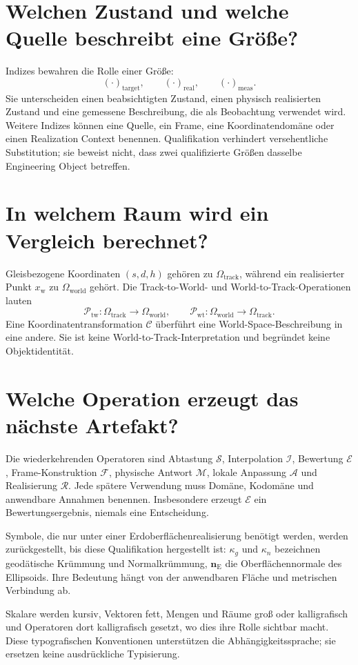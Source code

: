 \section{Welchen Zustand und welche Quelle beschreibt eine Größe?}

Indizes bewahren die Rolle einer Größe:
\[
(\cdot)_{\mathrm{target}},\qquad
(\cdot)_{\mathrm{real}},\qquad
(\cdot)_{\mathrm{meas}}.
\]
Sie unterscheiden einen beabsichtigten Zustand, einen physisch realisierten
Zustand und eine gemessene Beschreibung, die als Beobachtung verwendet wird.
Weitere Indizes können eine Quelle, ein Frame, eine Koordinatendomäne oder
einen Realization Context benennen. Qualifikation verhindert versehentliche
Substitution; sie beweist nicht, dass zwei qualifizierte Größen dasselbe
Engineering Object betreffen.

\section{In welchem Raum wird ein Vergleich berechnet?}

Gleisbezogene Koordinaten \((s,d,h)\) gehören zu
\(\Omega_{\mathrm{track}}\), während ein realisierter Punkt
\(x_{\mathrm w}\) zu \(\Omega_{\mathrm{world}}\) gehört. Die
Track-to-World- und World-to-Track-Operationen lauten
\[
\mathcal P_{\mathrm{tw}}:
\Omega_{\mathrm{track}}\rightarrow\Omega_{\mathrm{world}},
\qquad
\mathcal P_{\mathrm{wt}}:
\Omega_{\mathrm{world}}\rightarrow\Omega_{\mathrm{track}}.
\]
Eine Koordinatentransformation \(\mathcal C\) überführt eine
World-Space-Beschreibung in eine andere. Sie ist keine
World-to-Track-Interpretation und begründet keine Objektidentität.

\section{Welche Operation erzeugt das nächste Artefakt?}

Die wiederkehrenden Operatoren sind Abtastung \(\mathcal S\), Interpolation
\(\mathcal I\), Bewertung \(\mathcal E\), Frame-Konstruktion \(\mathcal F\),
physische Antwort \(\mathcal M\), lokale Anpassung \(\mathcal A\) und
Realisierung \(\mathcal R\). Jede spätere Verwendung muss Domäne, Kodomäne
und anwendbare Annahmen benennen. Insbesondere erzeugt \(\mathcal E\) ein
Bewertungsergebnis, niemals eine Entscheidung.

Symbole, die nur unter einer Erdoberflächenrealisierung benötigt werden,
werden zurückgestellt, bis diese Qualifikation hergestellt ist:
\(\kappa_g\) und \(\kappa_n\) bezeichnen geodätische Krümmung und
Normalkrümmung, \(\mathbf n_{\mathrm E}\) die Oberflächennormale des
Ellipsoids. Ihre Bedeutung hängt von der anwendbaren Fläche und metrischen
Verbindung ab.

Skalare werden kursiv, Vektoren fett, Mengen und Räume groß oder
kalligrafisch und Operatoren dort kalligrafisch gesetzt, wo dies ihre Rolle
sichtbar macht. Diese typografischen Konventionen unterstützen die
Abhängigkeitssprache; sie ersetzen keine ausdrückliche Typisierung.
